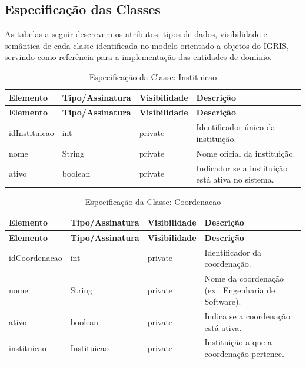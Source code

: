 \subsection{Especificação das Classes}
\label{subsec:4.3.2}

As tabelas a seguir descrevem os atributos, tipos de dados, visibilidade e semântica de cada classe identificada no modelo orientado a objetos do IGRIS, servindo como referência para a implementação das entidades de domínio.

\vspace{\baselineskip}

\Needspace{0.32\textheight}
\begin{longtable}{|L{3.5cm}|L{3.5cm}|L{3.5cm}|L{3.5cm}|}
\caption{Especificação da Classe: Instituicao} \\
\hline
\textbf{Elemento} & \textbf{Tipo/Assinatura} & \textbf{Visibilidade} & \textbf{Descrição} \\
\hline
\endfirsthead
\hline
\textbf{Elemento} & \textbf{Tipo/Assinatura} & \textbf{Visibilidade} & \textbf{Descrição} \\
\hline
\endhead
idInstituicao & int & private & Identificador único da instituição. \\
\hline
nome & String & private & Nome oficial da instituição. \\
\hline
ativo & boolean & private & Indicador se a instituição está ativa no sistema. \\
\hline
\end{longtable}

\fonteautores

\vspace{\baselineskip}

\Needspace{0.32\textheight}
\begin{longtable}{|L{3.5cm}|L{3.5cm}|L{3.5cm}|L{3.5cm}|}
\caption{Especificação da Classe: Coordenacao} \\
\hline
\textbf{Elemento} & \textbf{Tipo/Assinatura} & \textbf{Visibilidade} & \textbf{Descrição} \\
\hline
\endfirsthead
\hline
\textbf{Elemento} & \textbf{Tipo/Assinatura} & \textbf{Visibilidade} & \textbf{Descrição} \\
\hline
\endhead
idCoordenacao & int & private & Identificador da coordenação. \\
\hline
nome & String & private & Nome da coordenação (ex.: Engenharia de Software). \\
\hline
ativo & boolean & private & Indica se a coordenação está ativa. \\
\hline
instituicao & Instituicao & private & Instituição a que a coordenação pertence. \\
\hline
\end{longtable}


